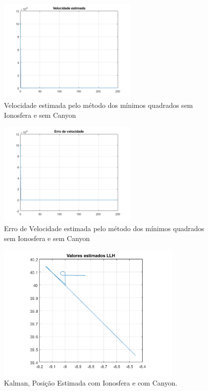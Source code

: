 \documentclass[palatino]{ist-report}
\begin{document}
\begin{figure}[ht]
	\centering
	\includegraphics[width=0.6\textwidth]{graphics/velocidade_estimada14.png}
	\caption{Velocidade estimada pelo método dos mínimos quadrados sem Ionosfera e sem Canyon}
	\label{Velocidade14}
\end{figure}


\begin{figure}[ht]
	\centering
	\includegraphics[width=0.6\textwidth]{graphics/erro_velocidade14.png}
	\caption{Erro de Velocidade estimada pelo método dos mínimos quadrados sem Ionosfera e sem Canyon}
	\label{eVelocidade14}
\end{figure}

\begin{figure}[ht]
	\centering
	\includegraphics[width=0.8\textwidth]{kalman_1/2-1-plot_posicao_estimada_LLH.png}
	\caption{Kalman, Posição Estimada com Ionosfera e com Canyon.}
	\label{Posicao21}
\end{figure}
\end{document}
